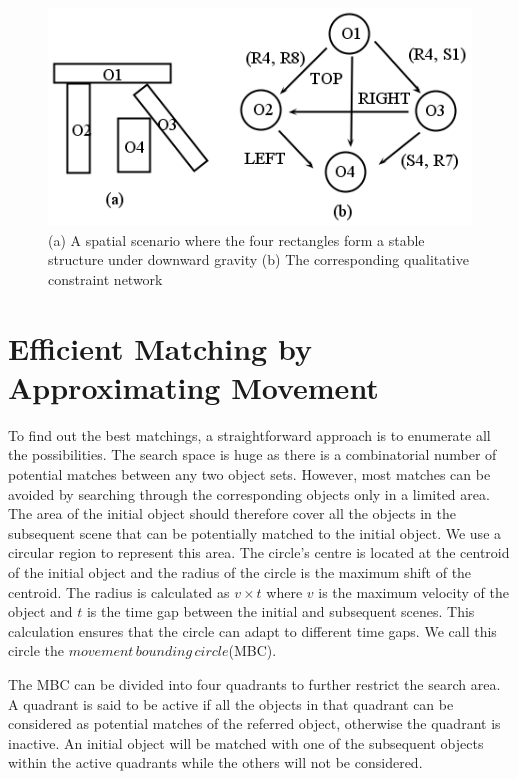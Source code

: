 \documentclass[letterpaper]{article}
\begin{document}
 \begin{figure}[h!]
\centering\includegraphics[scale=0.45]{QCN.png}\caption{(a) A spatial scenario where the four rectangles form a stable structure under downward gravity (b) The corresponding qualitative constraint network}
\label{QCN}
\end{figure}

\section{Efficient Matching by Approximating Movement}\label{approxM}

To find out the best matchings, a straightforward approach is to enumerate all the possibilities. The search space is huge as there is a combinatorial number of potential matches between any two object sets. However, most matches can be avoided by searching through the corresponding objects only in a limited area. The area of the initial object should therefore cover all the objects in the subsequent scene that can be potentially matched to the initial object.  We use a circular region to represent this area. The circle's centre is located at the centroid of the initial object and the radius of the circle is the maximum shift of the centroid. The radius is calculated as $v \times t$ where $v$ is the maximum velocity of the object and $t$ is the time gap between the initial and subsequent scenes. This calculation ensures that the circle can adapt to different time gaps. We call this circle the $movement\,bounding\,circle$(MBC).  

The MBC can be divided into four quadrants to further restrict the search area. A quadrant is said to be active if all the objects in that quadrant can be considered as potential matches of the referred object, otherwise the quadrant is inactive. An initial object will be matched with one of the subsequent objects within the active quadrants while the others will not be considered. 
\end{document}
